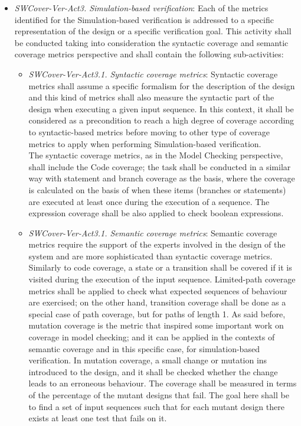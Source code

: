 \documentclass{template/openetcs_report}
\begin{document}
\begin{itemize}
\item {\it SWCover-Ver-Act3. Simulation-based verification}: Each of the metrics identified for the Simulation-based verification is addressed to a specific representation of the design or a specific verification goal. This activity shall be conducted taking into consideration the syntactic coverage and semantic coverage metrics perspective and shall contain the following sub-activities:
\begin{itemize}
\item {\it SWCover-Ver-Act3.1. Syntactic coverage metrics}: Syntactic coverage metrics shall assume a specific formalism for the description of the design and this kind of metrics shall also measure the syntactic part of the design when executing a given input sequence. In this context, it shall be considered as a precondition to reach a high degree of coverage according to syntactic-based
metrics before moving to other type of coverage metrics to apply when performing Simulation-based verification. \\The syntactic coverage metrics, as in the Model Checking perspective, shall include the Code coverage; the task shall be conducted in a similar way with statement and branch coverage as the basis, where the coverage is calculated on the basis of when these items (branches or statements) are executed at least once during the execution of a sequence. The expression coverage shall be also applied to check boolean expressions.
\item {\it SWCover-Ver-Act3.1. Semantic coverage metrics}: Semantic coverage metrics require the support of the experts involved in the design of the system and are more sophisticated than syntactic coverage metrics. Similarly to code coverage, a state or a transition shall be covered if it is visited during the execution of the input sequence. Limited-path coverage metrics shall be applied to check what expected sequences of behaviour are exercised; on the other hand, transition coverage shall be done as a special case of path coverage, but for paths of length 1. As said before, mutation coverage is the metric that inspired some important work on coverage in model checking; and it can be applied in the contexts of semantic coverage and in this specific case, for simulation-based verification. In mutation coverage, a small change or mutation ins introduced to the design, and it shall be checked whether the change leads to an erroneous behaviour. 
The coverage shall be measured in terms of the percentage of the mutant designs that fail.
The goal here shall be to find a set of input sequences such that for each mutant design there exists at least one test that fails on it. 
\end{itemize}
\end{itemize}
\end{document}
